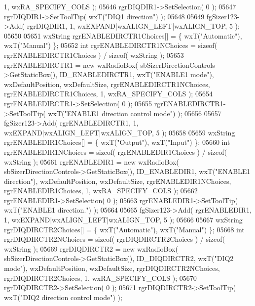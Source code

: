 \begin{DoxyCode}
       1, wxRA\_SPECIFY\_COLS );
05646     rgrDIQDIR1->SetSelection( 0 );
05647     rgrDIQDIR1->SetToolTip( wxT(\textcolor{stringliteral}{"DIQ1 direction"}) );
05648     
05649     fgSizer123->Add( rgrDIQDIR1, 1, wxEXPAND|wxALIGN\_LEFT|wxALIGN\_TOP, 5 );
05650     
05651     wxString rgrENABLEDIRCTR1Choices[] = \{ wxT(\textcolor{stringliteral}{"Automatic"}), wxT(\textcolor{stringliteral}{"Manual"}) \};
05652     \textcolor{keywordtype}{int} rgrENABLEDIRCTR1NChoices = \textcolor{keyword}{sizeof}( rgrENABLEDIRCTR1Choices ) / \textcolor{keyword}{sizeof}( wxString );
05653     rgrENABLEDIRCTR1 = \textcolor{keyword}{new} wxRadioBox( sbSizerDirectionControls->GetStaticBox(), 
      ID_ENABLEDIRCTR1, wxT(\textcolor{stringliteral}{"ENABLE1 mode"}), wxDefaultPosition, wxDefaultSize, rgrENABLEDIRCTR1NChoices, 
      rgrENABLEDIRCTR1Choices, 1, wxRA\_SPECIFY\_COLS );
05654     rgrENABLEDIRCTR1->SetSelection( 0 );
05655     rgrENABLEDIRCTR1->SetToolTip( wxT(\textcolor{stringliteral}{"ENABLE1 direction control mode"}) );
05656     
05657     fgSizer123->Add( rgrENABLEDIRCTR1, 1, wxEXPAND|wxALIGN\_LEFT|wxALIGN\_TOP, 5 );
05658     
05659     wxString rgrENABLEDIR1Choices[] = \{ wxT(\textcolor{stringliteral}{"Output"}), wxT(\textcolor{stringliteral}{"Input"}) \};
05660     \textcolor{keywordtype}{int} rgrENABLEDIR1NChoices = \textcolor{keyword}{sizeof}( rgrENABLEDIR1Choices ) / \textcolor{keyword}{sizeof}( wxString );
05661     rgrENABLEDIR1 = \textcolor{keyword}{new} wxRadioBox( sbSizerDirectionControls->GetStaticBox(), 
      ID_ENABLEDIR1, wxT(\textcolor{stringliteral}{"ENABLE1 direction"}), wxDefaultPosition, wxDefaultSize, rgrENABLEDIR1NChoices, 
      rgrENABLEDIR1Choices, 1, wxRA\_SPECIFY\_COLS );
05662     rgrENABLEDIR1->SetSelection( 0 );
05663     rgrENABLEDIR1->SetToolTip( wxT(\textcolor{stringliteral}{"ENABLE1 direction."}) );
05664     
05665     fgSizer123->Add( rgrENABLEDIR1, 1, wxEXPAND|wxALIGN\_LEFT|wxALIGN\_TOP, 5 );
05666     
05667     wxString rgrDIQDIRCTR2Choices[] = \{ wxT(\textcolor{stringliteral}{"Automatic"}), wxT(\textcolor{stringliteral}{"Manual"}) \};
05668     \textcolor{keywordtype}{int} rgrDIQDIRCTR2NChoices = \textcolor{keyword}{sizeof}( rgrDIQDIRCTR2Choices ) / \textcolor{keyword}{sizeof}( wxString );
05669     rgrDIQDIRCTR2 = \textcolor{keyword}{new} wxRadioBox( sbSizerDirectionControls->GetStaticBox(), 
      ID_DIQDIRCTR2, wxT(\textcolor{stringliteral}{"DIQ2 mode"}), wxDefaultPosition, wxDefaultSize, rgrDIQDIRCTR2NChoices, 
      rgrDIQDIRCTR2Choices, 1, wxRA\_SPECIFY\_COLS );
05670     rgrDIQDIRCTR2->SetSelection( 0 );
05671     rgrDIQDIRCTR2->SetToolTip( wxT(\textcolor{stringliteral}{"DIQ2 direction control mode"}) );

\end{DoxyCode}
